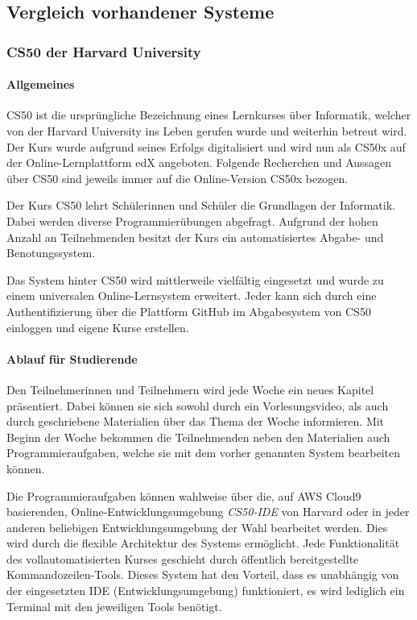 \subsection{Vergleich vorhandener Systeme}
\subsubsection{CS50 der Harvard University}
\paragraph{Allgemeines}
CS50 ist die ursprüngliche Bezeichnung eines Lernkurses über Informatik,
welcher von der Harvard University ins Leben gerufen wurde und weiterhin
betreut wird. Der Kurs wurde aufgrund seines Erfolgs digitalisiert und wird nun
als CS50x auf der Online-Lernplattform edX angeboten. Folgende Recherchen und
Aussagen über CS50 sind jeweils immer auf die Online-Version CS50x bezogen.

Der Kurs CS50 lehrt Schülerinnen und Schüler die Grundlagen der Informatik.
Dabei werden diverse Programmierübungen abgefragt. Aufgrund der hohen Anzahl an
Teilnehmenden besitzt der Kurs ein automatisiertes Abgabe- und Benotungssystem.

Das System hinter CS50 wird mittlerweile vielfältig eingesetzt und wurde zu
einem universalen Online-Lernsystem erweitert. Jeder kann sich durch eine
Authentifizierung über die Plattform GitHub im Abgabesystem von CS50 einloggen
und eigene Kurse erstellen. \parencite{cs50}

\paragraph{Ablauf für Studierende}
Den Teilnehmerinnen und Teilnehmern wird jede Woche ein neues Kapitel
präsentiert. Dabei können sie sich sowohl durch ein Vorlesungsvideo, als auch
durch geschriebene Materialien über das Thema der Woche informieren. Mit Beginn
der Woche bekommen die Teilnehmenden neben den Materialien auch
Programmieraufgaben, welche sie mit dem vorher genannten System bearbeiten
können. \parencite{cs50-edx}

Die Programmieraufgaben können wahlweise über die, auf AWS Cloud9 basierenden,
Online-Entwicklungsumgebung \emph{CS50-IDE} von Harvard oder in jeder anderen
beliebigen Entwicklungsumgebung der Wahl bearbeitet werden. Dies wird durch die
flexible Architektur des Systems ermöglicht. Jede Funktionalität des
vollautomatisierten Kurses geschieht durch öffentlich bereitgestellte
Kommandozeilen-Tools. Dieses System hat den Vorteil, dass es unabhängig von der
eingesetzten IDE (Entwicklungsumgebung) funktioniert, es wird lediglich ein
Terminal mit den jeweiligen Tools benötigt. \parencite{cs50-ide}


